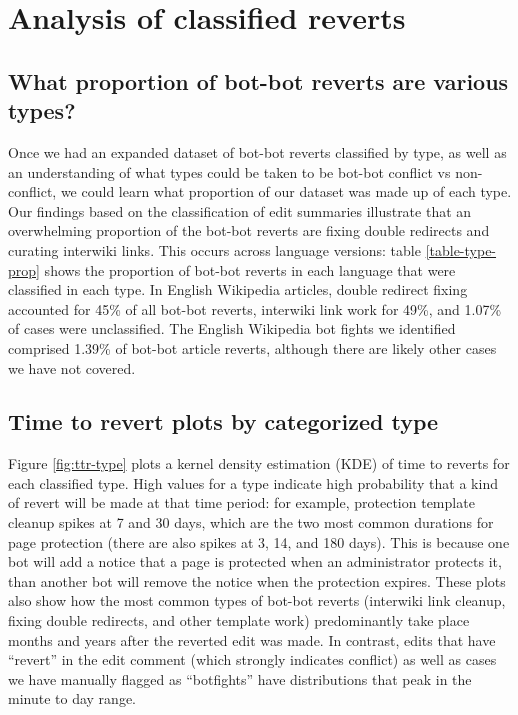\documentclass[format=acmsmall, review=false, screen=true]{acmart}%
\begin{document}
\section{Analysis of classified reverts} \label{s:coding:results}
\subsection{What proportion of bot-bot reverts are various types?}  
Once we had an expanded dataset of bot-bot reverts classified by type, as well as an understanding of what types could be taken to be bot-bot conflict vs non-conflict, we could learn what proportion of our dataset was made up of each type. Our findings based on the classification of edit summaries illustrate that an overwhelming proportion of the bot-bot reverts are fixing double redirects and curating interwiki links. This occurs across language versions: table \ref{table-type-prop} shows the proportion of bot-bot reverts in each language that were classified in each type. In English Wikipedia articles, double redirect fixing accounted for 45\% of all bot-bot reverts, interwiki link work for 49\%,  and 1.07\% of cases were unclassified. The English Wikipedia bot fights we identified comprised 1.39\% of bot-bot article reverts, although there are likely other cases we have not covered.

\subsection{Time to revert plots by categorized type}  
Figure \ref{fig:ttr-type} plots a kernel density estimation (KDE) of time to reverts for each classified type. High values for a type indicate high probability that a kind of revert will be made at that time period: for example, protection template cleanup spikes at 7 and 30 days, which are the two most common durations for page protection (there are also spikes at 3, 14, and 180 days). This is because one bot will add a notice that a page is protected when an administrator protects it, than another bot will remove the notice when the protection expires. These plots also show how the most common types of bot-bot reverts (interwiki link cleanup, fixing double redirects, and other template work) predominantly take place months and years after the reverted edit was made. In contrast, edits that have ``revert'' in the edit comment (which strongly indicates conflict) as well as cases we have manually flagged as ``botfights'' have distributions that peak in the minute to day range.  
\end{document}
